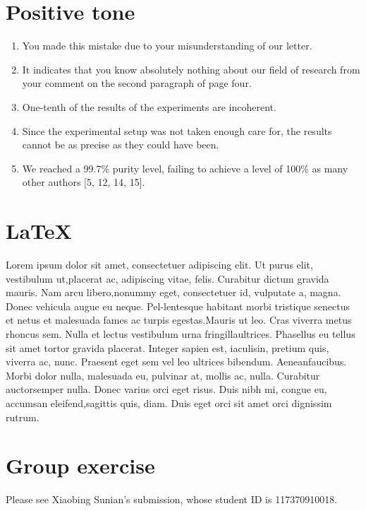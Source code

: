 \documentclass[paper=a4, fontsize=11pt]{scrartcl} %
\numberwithin{equation}{section} %
\numberwithin{figure}{section} %
\numberwithin{table}{section} %
\begin{document}
\section{Positive tone}
	\begin{enumerate}
		\item 
			You made this mistake due to your misunderstanding of our letter.
		\item 
			It indicates that you know absolutely nothing about our ﬁeld of research from your comment on the second paragraph of page four.
		\item
			 One-tenth of the results of the experiments are incoherent.
		\item
			 Since the experimental setup was not taken enough care for, the results cannot be as precise as they could have been.
		\item
			 We reached a 99.7\% purity level, failing to achieve a level of 100\% as many other authors [5, 12, 14, 15].
	\end{enumerate}

\section{\LaTeX}
	Lorem\citep{RN5}  ipsum  dolor\citep{RN11}  sit  amet,  consectetuer  adipiscing  elit.   Ut  purus  elit,  vestibulum  ut,placerat  ac,  adipiscing  vitae,  felis.   Curabitur  dictum  gravida  mauris.   Nam  arcu  libero,nonummy eget, consectetuer id, vulputate a, magna.  Donec vehicula augue eu neque.  Pel-lentesque habitant morbi tristique senectus et netus et malesuada fames ac turpis egestas.Mauris ut leo.  Cras viverra metus rhoncus sem.  Nulla et lectus vestibulum urna fringillaultrices.   Phasellus\citep{RN14}  eu  tellus  sit  amet  tortor  gravida  placerat.   Integer  sapien  est,  iaculisin,  pretium  quis,  viverra  ac,  nunc.   Praesent  eget  sem  vel  leo  ultrices  bibendum.   Aeneanfaucibus.  Morbi dolor nulla, malesuada eu, pulvinar at, mollis ac, nulla.  Curabitur\citep{RN10} auctorsemper  nulla.   Donec  varius  orci  eget  risus.   Duis  nibh  mi,  congue  eu,  accumsan  eleifend,sagittis quis, diam.  Duis eget orci sit amet orci dignissim rutrum.

\section{Group exercise}
	Please see Xiaobing Sunian's submission, whose student ID is 117370910018.



\end{document}
